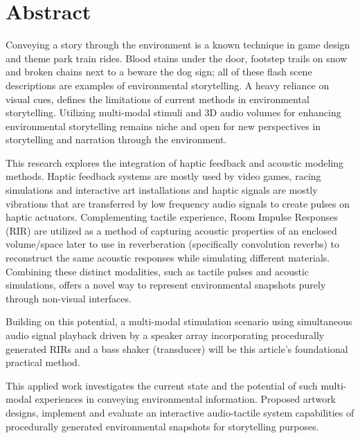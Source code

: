 \chapter*{Abstract}
    Conveying a story through the environment is a known technique in game design and theme park train rides\cite{Liminal_Space_Between_Embedded_and_Emergent_Narrative}. Blood stains under the door, footstep trails on snow and broken chains next to a beware the dog sign; all of these flash scene descriptions are examples of environmental storytelling. A heavy reliance on visual cues, defines the limitations of current methods in environmental storytelling. Utilizing multi-modal stimuli and 3D audio volumes for enhancing environmental storytelling remains niche and open for new perspectives in storytelling and narration through the environment.\par

    This research explores the integration of haptic feedback and acoustic modeling methods. Haptic feedback systems are mostly used by video games, racing simulations and interactive art installations and haptic signals are mostly vibrations that are transferred by low frequency audio signals to create pulses on haptic actuators. Complementing tactile experience, Room Impulse Responses (RIR) are utilized as a method of capturing acoustic properties of an enclosed volume/space\cite{Room_Acoustics} later to use in reverberation (specifically convolution reverbs) to reconstruct the same acoustic responses while simulating different materials. Combining these distinct modalities, such as tactile pulses and acoustic simulations, offers a novel way to represent environmental snapshots purely through non-visual interfaces.\par
    
    Building on this potential, a multi-modal stimulation scenario using simultaneous audio signal playback driven by a speaker array incorporating procedurally generated RIRs and a bass shaker (transducer) will be this article's foundational practical method. \par
    
    This applied work investigates the current state and the potential of such multi-modal experiences in conveying environmental information. Proposed artwork designs, implement and evaluate an interactive audio-tactile system capabilities of procedurally generated environmental snapshots for storytelling purposes.\par